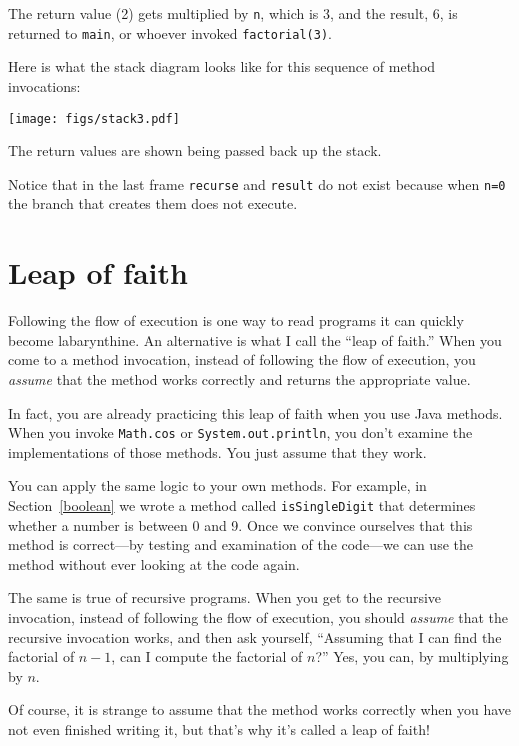 \documentclass[12pt]{book}
\theoremstyle{definition}
\begin{document}
\noindent The return value (2) gets multiplied by {\tt n}, which is 3,
and the result, 6, is returned to {\tt main}, or whoever
invoked {\tt factorial(3)}.


Here is what the stack diagram looks like for this sequence of
method invocations:

\texttt{[image: figs/stack3.pdf]}

The return values are shown being passed back up the stack.

Notice that in the last frame {\tt recurse} and {\tt result} do not
exist because when {\tt n=0} the branch that creates them does not
execute.


\section{Leap of faith}

Following the flow of execution is one way to read programs it can
quickly become labarynthine.  An alternative is what I call the ``leap
of faith.''  When you come to a method invocation, instead of
following the flow of execution, you {\em assume} that the method
works correctly and returns the appropriate value.

In fact, you are already practicing this leap of faith
when you use Java methods.  When you invoke {\tt Math.cos}
or {\tt System.out.println}, you don't examine the implementations of 
those methods.  You just assume that they work.

You can apply the same logic to your own methods.
For example, in Section~\ref{boolean} we wrote a method called
{\tt isSingleDigit} that determines whether a number is between
0 and 9.  Once we convince ourselves that this method
is correct---by testing and examination of the code---we can
use the method without ever looking at the code again.

The same is true of recursive programs.  When you get to
the recursive invocation, instead of following the flow of
execution, you should {\em assume} that the recursive invocation
works, and then ask yourself,
``Assuming that I can find the factorial of $n-1$, can I
compute the factorial of $n$?''  Yes, you can, by multiplying by $n$.

Of course, it is strange to assume that the method
works correctly when you have not even finished writing it,
but that's why it's called a leap of faith!
\end{document}

